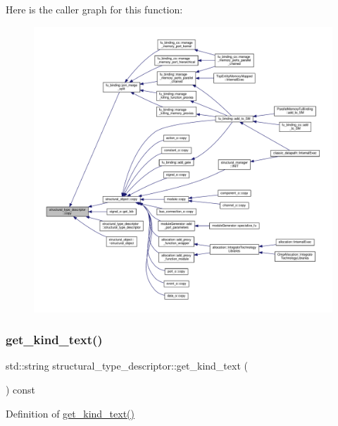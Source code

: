 Here is the caller graph for this function\+:
\nopagebreak
\begin{figure}[H]
\begin{center}
\leavevmode
\includegraphics[width=350pt]{dc/da4/structstructural__type__descriptor_af7c96c3d31b4d1c294d170cbf08c4c68_icgraph}
\end{center}
\end{figure}
\mbox{\label{structstructural__type__descriptor_aed5b7adc96acdd6cc4b3030c97c5d9b5}} 
\subsubsection{\texorpdfstring{get\+\_\+kind\+\_\+text()}{get\_kind\_text()}}
{\footnotesize\ttfamily std\+::string structural\+\_\+type\+\_\+descriptor\+::get\+\_\+kind\+\_\+text (\begin{DoxyParamCaption}{ }\end{DoxyParamCaption}) const\hspace{0.3cm}{\ttfamily [inline]}}



Definition of \hyperlink{structstructural__type__descriptor_aed5b7adc96acdd6cc4b3030c97c5d9b5}{get\+\_\+kind\+\_\+text()} 



